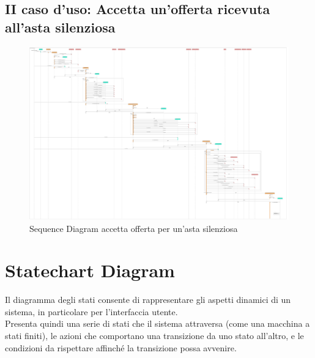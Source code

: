         \subsection{II caso d'uso: Accetta un'offerta ricevuta all'asta silenziosa}
            \begin{figure}[htbp!]
            \centering
                \includegraphics[width=1\linewidth]{Immagini/Diagrammi/Sequence Diagram/Analisi/AccettaOffertaSilenziosa.pdf}
            \caption{Sequence Diagram accetta offerta per un'asta silenziosa}
            \end{figure}

    \clearpage
    
    \section{Statechart Diagram}
        Il diagramma degli stati consente di rappresentare gli aspetti dinamici di un sistema, in particolare per l'interfaccia utente. \\
        Presenta quindi una serie di stati che il sistema attraversa (come una macchina a stati finiti), le azioni che comportano una transizione da uno stato all'altro, e le condizioni da rispettare affinché la transizione possa avvenire.

